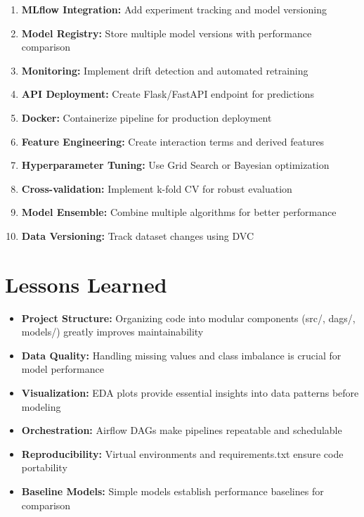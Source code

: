 \documentclass[11pt,a4paper]{article}
\begin{document}
\begin{enumerate}[leftmargin=1.5em, itemsep=2pt]
  \item \textbf{MLflow Integration:} Add experiment tracking and model versioning
  \item \textbf{Model Registry:} Store multiple model versions with performance comparison
  \item \textbf{Monitoring:} Implement drift detection and automated retraining
  \item \textbf{API Deployment:} Create Flask/FastAPI endpoint for predictions
  \item \textbf{Docker:} Containerize pipeline for production deployment
  \item \textbf{Feature Engineering:} Create interaction terms and derived features
  \item \textbf{Hyperparameter Tuning:} Use Grid Search or Bayesian optimization
  \item \textbf{Cross-validation:} Implement k-fold CV for robust evaluation
  \item \textbf{Model Ensemble:} Combine multiple algorithms for better performance
  \item \textbf{Data Versioning:} Track dataset changes using DVC
\end{enumerate}

\section{Lessons Learned}

\begin{itemize}[leftmargin=1.5em, itemsep=2pt]
  \item \textbf{Project Structure:} Organizing code into modular components (src/, dags/, 
        models/) greatly improves maintainability
  \item \textbf{Data Quality:} Handling missing values and class imbalance is crucial 
        for model performance
  \item \textbf{Visualization:} EDA plots provide essential insights into data patterns 
        before modeling
  \item \textbf{Orchestration:} Airflow DAGs make pipelines repeatable and schedulable
  \item \textbf{Reproducibility:} Virtual environments and requirements.txt ensure 
        code portability
  \item \textbf{Baseline Models:} Simple models establish performance baselines for 
        comparison
\end{itemize}
\end{document}

